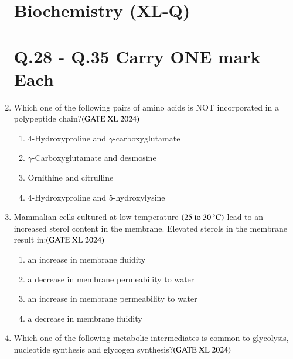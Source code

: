 \documentclass[journal]{IEEEtran}
\begin{document}
\begin{enumerate}
\section*{Biochemistry (XL-Q)}
\setcounter{enumi}{27}
\section*{Q.28 - Q.35 Carry ONE mark Each} 
    \item Which one of the following pairs of amino acids is NOT incorporated in a polypeptide chain?\hfill $\left(\text{GATE XL 2024}\right)$
    \begin{enumerate}
            \item 4-Hydroxyproline and $\gamma$-carboxyglutamate
            \item $\gamma$-Carboxyglutamate and desmosine
            \item Ornithine and citrulline
            \item 4-Hydroxyproline and 5-hydroxylysine
    \end{enumerate}

    \item Mammalian cells cultured at low temperature $\left(25 \text{ to } 30\,^\circ\text{C}\right)$ lead to an increased sterol content in the membrane. Elevated sterols in the membrane result in:\hfill $\left(\text{GATE XL 2024}\right)$
    \begin{enumerate}
            \item an increase in membrane fluidity
            \item a decrease in membrane permeability to water
            \item an increase in membrane permeability to water
            \item a decrease in membrane fluidity
    \end{enumerate}

    \item Which one of the following metabolic intermediates is common to glycolysis, nucleotide synthesis and glycogen synthesis?\hfill $\left(\text{GATE XL 2024}\right)$
    \begin{enumerate}
    \end{enumerate}


\end{enumerate}
\end{document}
